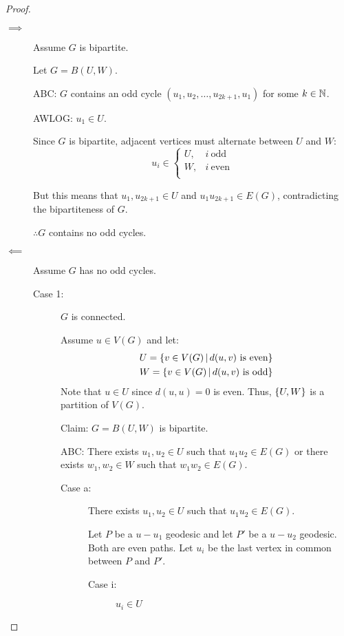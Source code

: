 \documentclass[letterpaper,12pt,fleqn]{article}
\begin{document}
\begin{proof}
  \begin{description}
  \item[]
  \item[\(\implies\)] Assume \(G\) is bipartite.

    Let \(G=B(U,W)\).

    ABC: \(G\) contains an odd cycle \((u_1,u_2,\ldots,u_{2k+1},u_1)\) for some \(k\in\mathbb{N}\).

    AWLOG: \(u_1\in U\).

    Since \(G\) is bipartite, adjacent vertices must alternate between \(U\) and \(W\):
    \[u_i\in\begin{cases}
    U, & i\ \text{odd} \\
    W, & i\ \text{even} \\
    \end{cases}\]

    But this means that \(u_1,u_{2k+1}\in U\) and \(u_1u_{2k+1}\in E(G)\), contradicting the bipartiteness of \(G\).

    \(\therefore G\) contains no odd cycles.

  \item[\(\impliedby\)] Assume \(G\) has no odd cycles.
    \begin{description}
    \item[Case 1:] \(G\) is connected.
      
      Assume \(u\in V(G)\) and let:
      \begin{gather*}
        U=\left\{{v\in V(G)}\,\middle|\,{d(u,v)\ \text{is even}}\right\} \\
        W=\left\{{v\in V(G)}\,\middle|\,{d(u,v)\ \text{is odd}}\right\}
      \end{gather*}
      Note that \(u\in U\) since \(d(u,u)=0\) is even.  Thus, \(\{U,W\}\) is a partition of \(V(G)\).

      Claim: \(G=B(U,W)\) is bipartite.

      ABC: There exists \(u_1,u_2\in U\) such that \(u_1u_2\in E(G)\) or there exists \(w_1,w_2\in W\) such that
      \(w_1w_2\in E(G)\).
      \begin{description}
      \item[Case a:] There exists \(u_1,u_2\in U\) such that \(u_1u_2\in E(G)\).

        Let \(P\) be a \(u-u_1\) geodesic and let \(P'\) be a \(u-u_2\) geodesic.  Both are even paths.  Let \(u_i\)
        be the last vertex in common between \(P\) and \(P'\).
        \begin{description}
        \item[Case i:] \(u_i\in U\)


\end{description}
\end{description}
\end{description}
\end{description}
\end{proof}
\end{document}
